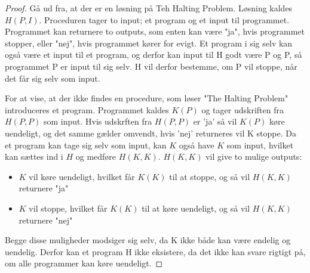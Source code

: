 \begin{proof}
Gå ud fra, at der er en løsning på Teh Halting Problem. Løsning kaldes $H(P, I)$. Proceduren tager to input; et program og et input til programmet. Programmet kan returnere to outputs, som enten kan være "ja", hvis programmet stopper, eller "nej", hvis programmet kører for evigt. 
Et program i sig selv kan også være et input til et program, og derfor kan input til H godt være P og P, så programmet P er input til sig selv.
H vil derfor bestemme, om P vil stoppe, når det får sig selv som input.

For at vise, at der ikke findes en procedure, som løser "The Halting Problem" introduceres et program. 
Programmet kaldes $K(P)$ og tager udskriften fra $H(P,P)$ som input.
Hvis udskrften fra $H(P,P)$ er 'ja' så vil $K(P)$ køre uendeligt, og det samme gælder omvendt, hvis 'nej' returneres vil K stoppe.  
Da et program kan tage sig selv som input, kan $K$ også have $K$ som input, hvilket kan sættes ind i $H$ og  medføre $H(K,K)$. 
$H(K, K)$ vil give to mulige outputs:
\begin{itemize}
	\item $K$ vil køre uendeligt, hvilket får $K(K)$ til at stoppe, og så vil $H(K,K)$ returnere "ja"
	\item  $K$ vil stoppe, hvilket får $K(K)$ til at køre uendeligt, og så vil $H(K,K)$ returnere "nej"
\end{itemize}
Begge disse muligheder modsiger sig selv, da K ikke både kan være endelig og uendelig. Derfor kan et program H ikke eksistere, da det ikke kan svare rigtigt på, om alle programmer kan køre uendeligt. 

\end{proof}
